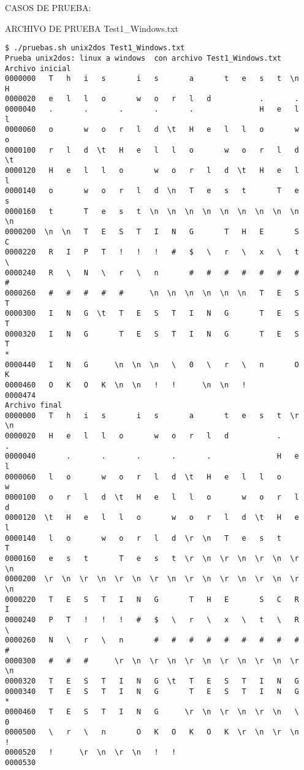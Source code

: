 \documentclass[titlepage,a4paper]{article}
\begin{document}
CASOS DE PRUEBA:

ARCHIVO DE PRUEBA Test1_Windows.txt
\begin{lstlisting}
$ ./pruebas.sh unix2dos Test1_Windows.txt 
Prueba unix2dos: linux a windows  con archivo Test1_Windows.txt
Archivo inicial
0000000   T   h   i   s       i   s       a       t   e   s   t  \n   H
0000020   e   l   l   o       w   o   r   l   d           .       .    
0000040   .       .       .       .       .               H   e   l   l
0000060   o       w   o   r   l   d  \t   H   e   l   l   o       w   o
0000100   r   l   d  \t   H   e   l   l   o       w   o   r   l   d  \t
0000120   H   e   l   l   o       w   o   r   l   d  \t   H   e   l   l
0000140   o       w   o   r   l   d  \n   T   e   s   t       T   e   s
0000160   t       T   e   s   t  \n  \n  \n  \n  \n  \n  \n  \n  \n  \n
0000200  \n  \n   T   E   S   T   I   N   G       T   H   E       S   C
0000220   R   I   P   T   !   !   !   #   $   \   r   \   x   \   t   \
0000240   R   \   N   \   r   \   n       #   #   #   #   #   #   #   #
0000260   #   #   #   #   #      \n  \n  \n  \n  \n  \n   T   E   S   T
0000300   I   N   G  \t   T   E   S   T   I   N   G       T   E   S   T
0000320   I   N   G       T   E   S   T   I   N   G       T   E   S   T
*
0000440   I   N   G      \n  \n  \n   \   0   \   r   \   n       O   K
0000460   O   K   O   K  \n  \n   !   !      \n  \n   !
0000474
Archivo final
0000000   T   h   i   s       i   s       a       t   e   s   t  \r  \n
0000020   H   e   l   l   o       w   o   r   l   d           .       .
0000040       .       .       .       .       .               H   e   l
0000060   l   o       w   o   r   l   d  \t   H   e   l   l   o       w
0000100   o   r   l   d  \t   H   e   l   l   o       w   o   r   l   d
0000120  \t   H   e   l   l   o       w   o   r   l   d  \t   H   e   l
0000140   l   o       w   o   r   l   d  \r  \n   T   e   s   t       T
0000160   e   s   t       T   e   s   t  \r  \n  \r  \n  \r  \n  \r  \n
0000200  \r  \n  \r  \n  \r  \n  \r  \n  \r  \n  \r  \n  \r  \n  \r  \n
0000220   T   E   S   T   I   N   G       T   H   E       S   C   R   I
0000240   P   T   !   !   !   #   $   \   r   \   x   \   t   \   R   \
0000260   N   \   r   \   n       #   #   #   #   #   #   #   #   #   #
0000300   #   #   #      \r  \n  \r  \n  \r  \n  \r  \n  \r  \n  \r  \n
0000320   T   E   S   T   I   N   G  \t   T   E   S   T   I   N   G    
0000340   T   E   S   T   I   N   G       T   E   S   T   I   N   G    
*
0000460   T   E   S   T   I   N   G      \r  \n  \r  \n  \r  \n   \   0
0000500   \   r   \   n       O   K   O   K   O   K  \r  \n  \r  \n   !
0000520   !      \r  \n  \r  \n   !   !
0000530



\end{lstlisting}
\end{document}
